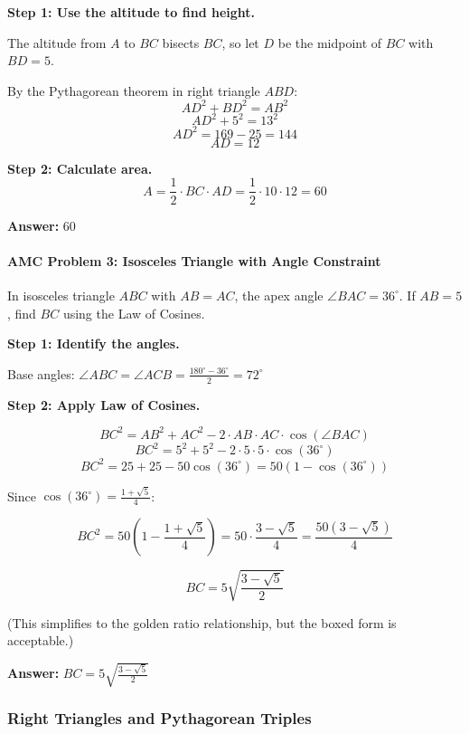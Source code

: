 ﻿\documentclass[12pt]{extarticle}
\begin{document}
\begin{solutionbox}
\textbf{Step 1: Use the altitude to find height.}

The altitude from $A$ to $BC$ bisects $BC$, so let $D$ be the midpoint of $BC$ with $BD = 5$.

By the Pythagorean theorem in right triangle $ABD$:
\[AD^2 + BD^2 = AB^2\]
\[AD^2 + 5^2 = 13^2\]
\[AD^2 = 169 - 25 = 144\]
\[AD = 12\]

\textbf{Step 2: Calculate area.}
\[A = \frac{1}{2} \cdot BC \cdot AD = \frac{1}{2} \cdot 10 \cdot 12 = 60\]

\textbf{Answer:} $\boxed{60}$
\end{solutionbox}

\paragraph{AMC Problem 3: Isosceles Triangle with Angle Constraint}
In isosceles triangle $ABC$ with $AB = AC$, the apex angle $\angle BAC = 36^{\circ}$. If $AB = 5$, find $BC$ using the Law of Cosines.

\begin{solutionbox}
\textbf{Step 1: Identify the angles.}

Base angles: $\angle ABC = \angle ACB = \frac{180^{\circ} - 36^{\circ}}{2} = 72^{\circ}$

\textbf{Step 2: Apply Law of Cosines.}

\[BC^2 = AB^2 + AC^2 - 2 \cdot AB \cdot AC \cdot \cos(\angle BAC)\]
\[BC^2 = 5^2 + 5^2 - 2 \cdot 5 \cdot 5 \cdot \cos(36^{\circ})\]
\[BC^2 = 25 + 25 - 50\cos(36^{\circ}) = 50(1 - \cos(36^{\circ}))\]

Since $\cos(36^{\circ}) = \frac{1 + \sqrt{5}}{4}$:

\[BC^2 = 50\left(1 - \frac{1+\sqrt{5}}{4}\right) = 50 \cdot \frac{3 - \sqrt{5}}{4} = \frac{50(3-\sqrt{5})}{4}\]

\[BC = 5\sqrt{\frac{3-\sqrt{5}}{2}}\]

(This simplifies to the golden ratio relationship, but the boxed form is acceptable.)

\textbf{Answer:} $\boxed{BC = 5\sqrt{\frac{3-\sqrt{5}}{2}}}$
\end{solutionbox}

\subsubsection{Right Triangles and Pythagorean Triples}
\end{document}
